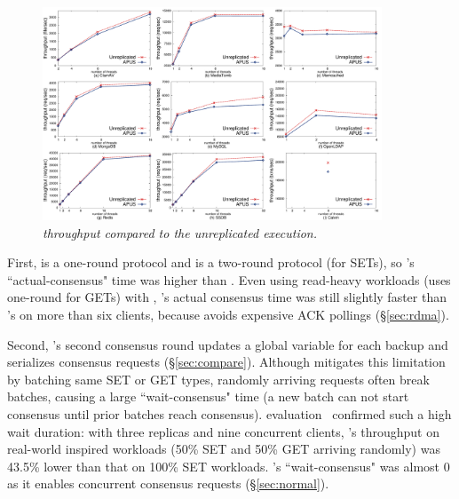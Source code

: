 \begin{figure}[t]
\centering
\includegraphics[width=0.9\textwidth]{figures/throughput}
\vspace{-.07in}
\caption{\small {\em \xxx throughput compared to the unreplicated
execution.}}
\vspace{-.20in}
\label{fig:tput}
\end{figure}




First, \xxx is a one-round protocol and \dare is a two-round protocol (for 
SETs), so \dare's ``actual-consensus" time was \fasterDAREconsensusonly higher 
than \xxx. Even using read-heavy workloads (\dare uses one-round for GETs) 
with \xxx, \xxx's actual consensus time was still slightly faster than \dare's 
on more than six clients, because \xxx avoids expensive ACK 
pollings (\S\ref{sec:rdma}).

Second, \dare's second consensus round updates a global variable for each 
backup and serializes consensus requests (\S\ref{sec:compare}). 
Although \dare mitigates this limitation by batching same SET or GET types, 
randomly arriving requests often break batches, causing a large 
``wait-consensus" time (a new batch can not start consensus until prior batches 
reach consensus). \dare evaluation~\cite{dare:hpdc15} confirmed such a high 
wait duration: with three replicas and nine concurrent clients, \dare's 
throughput on real-world inspired workloads (50\% SET and 50\% GET arriving 
randomly) was 43.5\% lower than that on 100\% SET workloads. \xxx's 
``wait-consensus" was almost 0 as it enables concurrent consensus requests 
(\S\ref{sec:normal}).

